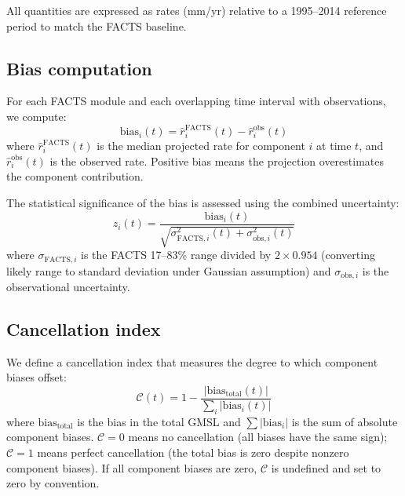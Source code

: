 \documentclass[11pt]{article}
\begin{document}
All quantities are expressed as rates (mm/yr) relative to a 1995--2014 reference period to match the FACTS baseline.

\subsection{Bias computation}

For each FACTS module and each overlapping time interval with observations, we compute:
\begin{equation}
  \text{bias}_i(t) = \hat{r}_i^{\text{FACTS}}(t) - \hat{r}_i^{\text{obs}}(t)
  \label{eq:bias}
\end{equation}
where $\hat{r}_i^{\text{FACTS}}(t)$ is the median projected rate for component $i$ at time $t$, and $\hat{r}_i^{\text{obs}}(t)$ is the observed rate.  Positive bias means the projection overestimates the component contribution.

The statistical significance of the bias is assessed using the combined uncertainty:
\begin{equation}
  z_i(t) = \frac{\text{bias}_i(t)}{\sqrt{\sigma_{\text{FACTS},i}^2(t) + \sigma_{\text{obs},i}^2(t)}}
  \label{eq:zscore}
\end{equation}
where $\sigma_{\text{FACTS},i}$ is the FACTS 17--83\% range divided by $2 \times 0.954$ (converting likely range to standard deviation under Gaussian assumption) and $\sigma_{\text{obs},i}$ is the observational uncertainty.

\subsection{Cancellation index}

We define a cancellation index that measures the degree to which component biases offset:
\begin{equation}
  \mathcal{C}(t) = 1 - \frac{|\text{bias}_{\text{total}}(t)|}{\sum_i |\text{bias}_i(t)|}
  \label{eq:cancellation}
\end{equation}
where $\text{bias}_{\text{total}}$ is the bias in the total GMSL and $\sum |\text{bias}_i|$ is the sum of absolute component biases.  $\mathcal{C} = 0$ means no cancellation (all biases have the same sign); $\mathcal{C} = 1$ means perfect cancellation (the total bias is zero despite nonzero component biases).  If all component biases are zero, $\mathcal{C}$ is undefined and set to zero by convention.


\end{document}
